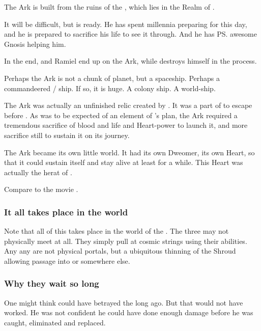 The Ark is built from the ruins of the , which lies in the Realm of . 

It will be difficult, but \Azraid{} is ready. 
He has spent millennia preparing for this day, and he is prepared to sacrifice his life to see it through. 
And he has \ps{\Ishnaruchaefir} awesome Gnosis helping him. 

In the end, \Ishnaruchaefir{} and Ramiel end up on the Ark, while \Azraid{} destroys himself in the process. 

Perhaps the Ark is not a chunk of planet, but a spaceship. 
Perhaps a commandeered \bane/\resphan{} ship. 
If so, it is huge. 
A colony ship. 
A world-ship. 

The Ark was actually an unfinished relic created by \Sethicus. 
It was a part of  to escape \Miith before . 
As was to be expected of an element of \Sethicus's plan, the Ark required a tremendous sacrifice of blood and life and Heart-power to launch it, and more sacrifice still to sustain it on its journey. 

The Ark became its own little world.
It had its own Dweomer, its own Heart, so that it could sustain itself and stay alive at least for a while.
This Heart was actually the herat of \Tiamat.

Compare to the movie \cite{Movie:Watchmen}. 





\subsubsection{It all takes place in the \matrix{} world}
Note that all of this takes place in the world of the \matrices. 
The three may not physically meet at all. 
They simply pull at cosmic strings using their \vertex{} abilities. 
Any any  are not physical portals, but a ubiquitous thinning of the Shroud allowing passage into \Erebos{} or somewhere else. 





\subsubsection{Why they wait so long}
One might think \Azraid{} could have betrayed the \banes{} long ago. 
But that would not have worked. 
He was not confident he could have done enough damage before he was caught, eliminated and replaced. 


